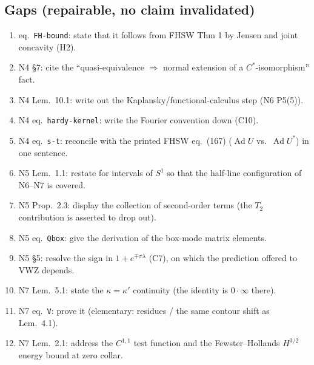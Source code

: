 \documentclass[11pt]{article}
\newcommand{\NIV}{N4}\newcommand{\NV}{N5}\newcommand{\NVI}{N6}\newcommand{\NVII}{N7}
\newcommand{\Ad}{\operatorname{Ad}}
\begin{document}
\subsection{Gaps (repairable, no claim invalidated)}
\begin{enumerate}[leftmargin=1.6em]
\item \NII{} eq.~\texttt{FH-bound}: state that it follows from FHSW Thm 1 by Jensen and joint concavity (H2).
\item \NIV{} \S7: cite the ``quasi-equivalence $\Rightarrow$ normal extension of a $C^*$-isomorphism'' fact.
\item \NIV{} Lem.~10.1: write out the Kaplansky/functional-calculus step (\NVI{} P5(5)).
\item \NIV{} eq.~\texttt{hardy-kernel}: write the Fourier convention down (C10).
\item \NIV{} eq.~\texttt{s-t}: reconcile with the printed FHSW eq.~(167) ($\Ad U$ vs.\ $\Ad U^*$) in one sentence.
\item \NV{} Lem.~1.1: restate for intervals of $S^1$ so that the half-line configuration of \NVI--\NVII{} is covered.
\item \NV{} Prop.~2.3: display the collection of second-order terms (the $T_2$ contribution is asserted to drop out).
\item \NV{} eq.~\texttt{Qbox}: give the derivation of the box-mode matrix elements.
\item \NV{} \S5: resolve the sign in $1+e^{\mp\pi\lambda}$ (C7), on which the prediction offered to VWZ depends.
\item \NVII{} Lem.~5.1: state the $\kappa=\kappa'$ continuity (the identity is $0\cdot\infty$ there).
\item \NVII{} eq.~\texttt{V}: prove it (elementary: residues / the same contour shift as Lem.~4.1).
\item \NVII{} Lem.~2.1: address the $C^{1,1}$ test function and the Fewster--Hollands $H^{3/2}$ energy bound at zero collar.
\end{enumerate}
\end{document}
